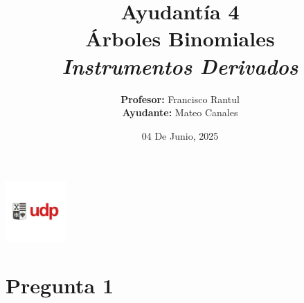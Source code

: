 \documentclass{beamer}
\title{Ayudantía 4 \\  Árboles Binomiales
\\ \large\textit{Instrumentos Derivados}}
\author{
  \texorpdfstring{
    \textbf{Profesor:} Francisco Rantul \\[0.3em]
    \textbf{Ayudante:} Mateo Canales
  }{Profesor: Francisco Rantul, Ayudante: Mateo Canales}
}
\institute{Universidad Diego Portales}
\date{04 De Junio, 2025}
\begin{document}
\begin{frame}
    \titlepage
    \vfill
    \centering
    \includegraphics[width=2.3118cm]{../imagenes/logo.png}
  \end{frame}

\newcommand{\cajaverde}[1]{%
  \fcolorbox{blue}{green!20}{%
    { #1}%
  }
}
\newcommand{\cajaverdeletra}[1]{%
  \fcolorbox{blue}{green!20}{%
    \parbox{0.9\linewidth}{\justifying #1}%
  }
}
\newcommand{\formula}[1]{\textcolor{blue}{#1}}
\newcommand{\entero}[1]{\pgfmathprintnumber[fixed, precision=0]{#1}}
\newcommand{\decimal}[1]{\pgfmathprintnumber[fixed, precision=2]{#1}}
\newcommand{\decimalx}[1]{\pgfmathprintnumber[fixed, precision=3]{#1}}
\newcommand{\decimalxx}[1]{\pgfmathprintnumber[fixed, precision=4]{#1}}
\newcommand{\porcentaje}[1]{%
  \pgfmathsetmacro{\temp}{#1*100}%
  \pgfmathprintnumber[fixed, precision=2]{\temp}\%%
  }
\newcommand{\dinero}[1]{%
  \$\,\pgfmathprintnumber[fixed, precision=0]{#1}
  }
\newcommand{\dineros}[1]{%
  \$\,\pgfmathprintnumber[fixed, precision=1]{#1}
  }
\newcommand{\Desarrollo}[1]{Desarrollo Parte {#1})}


\section{Pregunta 1}

\newcommand{\Kuno}{100}
\newcommand{\diezp}{0.1}
\newcommand{\ochop}{0.08}
\newcommand{\semestre}{0.5}
\newcommand{\arbol}{$p = \frac{e^{r\cdot \Delta t}-d}{u-d}$}
\newcommand{\neutral}{$f = e^{-r \cdot \Delta t}\cdot (p \cdot f_u+(1-p) \cdot f_d)$}
\newcommand{\putcall}{$S_0+p = K \cdot e^{-r \cdot T}+c$}
\newcommand{\ceroud}{$S_0u|d=S_0*(1+(subida|bajada)) $}
\newcommand{\Preguno}{ El precio de una acción es de \dinero{\Kuno}. En 6 meses más se espera que suba o baje un \porcentaje{\diezp}. La tasa libre de riesgo es del \porcentaje{\ochop} anual continua. } 
\newcommand{\Pregunoa}{¿Cuál es el valor de una opción call europea de 1 año con strike Price $ K = \dinero{\Kuno} $?}
\newcommand{\Pregunob}{¿Cuál es el valor de una opción put europea de 1 año con strike Price $ K = \dinero{\Kuno} $?}
\newcommand{\Pregunoc}{Verifique que se cumple la paridad Put-Call}
\newcommand{\Uuno}{1.1}
\newcommand{\Duno}{0.9}
\end{document}
